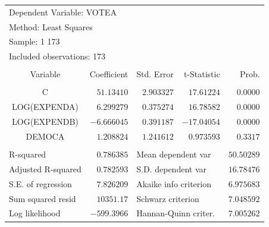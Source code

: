 \documentclass[12pt]{report}
\begin{document}
\begin{table}[H]
	\centering
	\begin{tabular}{lrrrr}
		\multicolumn{3}{l}{Dependent Variable: VOTEA}&\multicolumn{1}{c}{}&\multicolumn{1}{c}{}\\
		\multicolumn{3}{l}{Method: Least Squares}&\multicolumn{1}{c}{}&\multicolumn{1}{c}{}\\
		\multicolumn{2}{l}{Sample: 1 173}&\multicolumn{1}{c}{}&\multicolumn{1}{c}{}&\multicolumn{1}{c}{}\\
		\multicolumn{3}{l}{Included observations: 173}&\multicolumn{1}{c}{}&\multicolumn{1}{c}{}\\
		[4.5pt] \hline \\ [-4.5pt]
		\multicolumn{1}{c}{Variable}&\multicolumn{1}{r}{Coefficient}&\multicolumn{1}{r}{Std. Error}&\multicolumn{1}{r}{t-Statistic}&\multicolumn{1}{r}{Prob.}\\
		[4.5pt] \hline \\ [-4.5pt]
		\multicolumn{1}{c}{C}&\multicolumn{1}{r}{$51.13410$}&\multicolumn{1}{r}{$2.903327$}&\multicolumn{1}{r}{$17.61224$}&\multicolumn{1}{r}{$0.0000$}\\
		\multicolumn{1}{c}{LOG(EXPENDA)}&\multicolumn{1}{r}{$6.299279$}&\multicolumn{1}{r}{$0.375274$}&\multicolumn{1}{r}{$16.78582$}&\multicolumn{1}{r}{$0.0000$}\\
		\multicolumn{1}{c}{LOG(EXPENDB)}&\multicolumn{1}{r}{$-6.666045$}&\multicolumn{1}{r}{$0.391187$}&\multicolumn{1}{r}{$-17.04054$}&\multicolumn{1}{r}{$0.0000$}\\
		\multicolumn{1}{c}{DEMOCA}&\multicolumn{1}{r}{$1.208824$}&\multicolumn{1}{r}{$1.241612$}&\multicolumn{1}{r}{$0.973593$}&\multicolumn{1}{r}{$0.3317$}\\
		[4.5pt] \hline \\ [-4.5pt]
		\multicolumn{1}{l}{R-squared}&\multicolumn{1}{r}{$0.786385$}&\multicolumn{2}{l}{Mean dependent var}&\multicolumn{1}{r}{$50.50289$}\\
		\multicolumn{1}{l}{Adjusted R-squared}&\multicolumn{1}{r}{$0.782593$}&\multicolumn{2}{l}{S.D. dependent var}&\multicolumn{1}{r}{$16.78476$}\\
		\multicolumn{1}{l}{S.E. of regression}&\multicolumn{1}{r}{$7.826209$}&\multicolumn{2}{l}{Akaike info criterion}&\multicolumn{1}{r}{$6.975683$}\\
		\multicolumn{1}{l}{Sum squared resid}&\multicolumn{1}{r}{$10351.17$}&\multicolumn{2}{l}{Schwarz criterion}&\multicolumn{1}{r}{$7.048592$}\\
		\multicolumn{1}{l}{Log likelihood}&\multicolumn{1}{r}{$-599.3966$}&\multicolumn{2}{l}{Hannan-Quinn criter.}&\multicolumn{1}{r}{$7.005262$}\\

\end{tabular}
\end{table}
\end{document}

